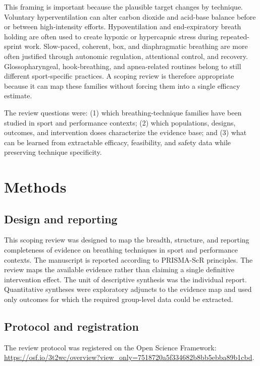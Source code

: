 \documentclass[12pt,a4paper]{article}
\begin{document}
This framing is important because the plausible target changes by technique. Voluntary hyperventilation can alter carbon dioxide and acid-base balance before or between high-intensity efforts. Hypoventilation and end-expiratory breath holding are often used to create hypoxic or hypercapnic stress during repeated-sprint work. Slow-paced, coherent, box, and diaphragmatic breathing are more often justified through autonomic regulation, attentional control, and recovery. Glossopharyngeal, hook-breathing, and apnea-related routines belong to still different sport-specific practices. A scoping review is therefore appropriate because it can map these families without forcing them into a single efficacy estimate.

The review questions were: (1) which breathing-technique families have been studied in sport and performance contexts; (2) which populations, designs, outcomes, and intervention doses characterize the evidence base; and (3) what can be learned from extractable efficacy, feasibility, and safety data while preserving technique specificity.

\section{Methods}
\subsection{Design and reporting}
This scoping review was designed to map the breadth, structure, and reporting completeness of evidence on breathing techniques in sport and performance contexts. The manuscript is reported according to PRISMA-ScR principles. The review maps the available evidence rather than claiming a single definitive intervention effect. The unit of descriptive synthesis was the individual report. Quantitative syntheses were exploratory adjuncts to the evidence map and used only outcomes for which the required group-level data could be extracted.

\subsection{Protocol and registration}
The review protocol was registered on the Open Science Framework: \url{https://osf.io/3t2wc/overview?view_only=7518720a5f334682b8bb5ebba89b1cbd}.
\end{document}
